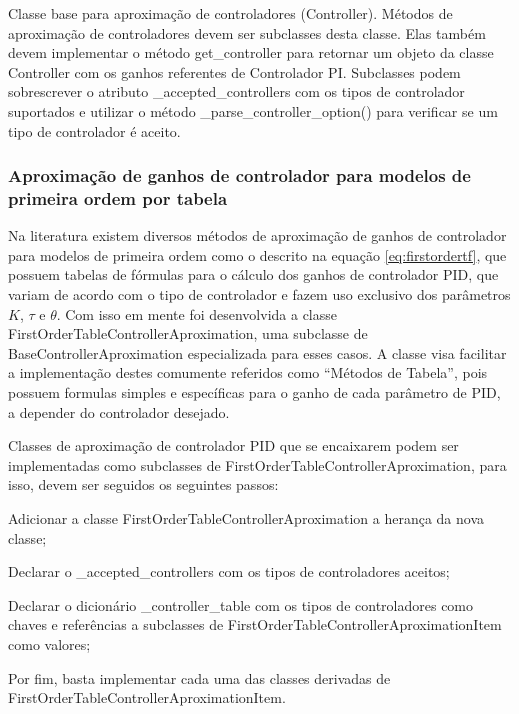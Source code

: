 Classe base para aproximação de controladores (Controller).
Métodos de aproximação de controladores devem ser subclasses desta classe.
Elas também devem implementar o método get\_controller para retornar um objeto da classe Controller com os ganhos
referentes de Controlador PI\@.
Subclasses podem sobrescrever o atributo \_accepted\_controllers com os tipos de controlador suportados e utilizar o
método \_parse\_controller\_option() para verificar se um tipo de controlador é aceito.

\subsubsection{Aproximação de ganhos de controlador para modelos de primeira ordem por tabela}\label{subsubsec:agcmpot}

Na literatura existem diversos métodos de aproximação de ganhos de controlador para modelos de primeira ordem
como o descrito na equação \ref{eq:firstordertf}, que possuem tabelas de fórmulas para o cálculo dos ganhos de
controlador PID, que variam de acordo com o tipo de controlador e fazem uso exclusivo dos parâmetros $K$, $\tau$ e
$\theta$.
Com isso em mente foi desenvolvida a classe FirstOrderTableControllerAproximation, uma subclasse de
BaseControllerAproximation especializada para esses casos.
A classe visa facilitar a implementação destes comumente referidos como “Métodos de Tabela”, pois possuem formulas
simples e específicas para o ganho de cada parâmetro de PID, a depender do controlador desejado.

Classes de aproximação de controlador PID que se encaixarem podem ser implementadas como subclasses de
FirstOrderTableControllerAproximation, para isso, devem ser seguidos os seguintes passos:

\begin{alineas}
    \item Adicionar a classe FirstOrderTableControllerAproximation a herança da nova classe;
    \item Declarar o \_accepted\_controllers com os tipos de controladores aceitos;
    \item Declarar o dicionário \_controller\_table com os tipos de controladores como chaves e referências a subclasses de FirstOrderTableControllerAproximationItem como valores;
    \item Por fim, basta implementar cada uma das classes derivadas de FirstOrderTableControllerAproximationItem.
\end{alineas}

